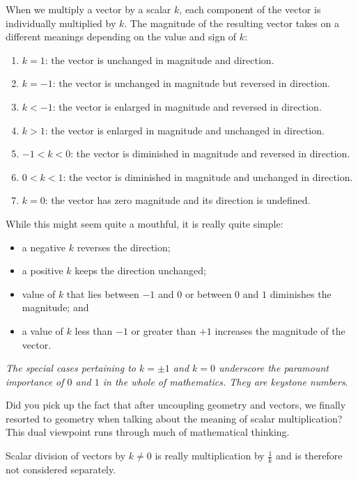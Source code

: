 \documentclass[
  a4paper,
]{article}
\providecommand{\tightlist}{%
  \setlength{\itemsep}{0pt}\setlength{\parskip}{0pt}}
\begin{document}
When we multiply a vector by a scalar \(k\), each component of the
vector is individually multiplied by \(k\). The magnitude of the
resulting vector takes on a different meanings depending on the value
and sign of \(k\):

\begin{enumerate}
\item
  \(k = 1\): the vector is unchanged in magnitude and direction.
\item
  \(k = -1\): the vector is unchanged in magnitude but reversed in
  direction.
\item
  \(k < -1\): the vector is enlarged in magnitude and reversed in
  direction.
\item
  \(k > 1\): the vector is enlarged in magnitude and unchanged in
  direction.
\item
  \(-1 < k < 0\): the vector is diminished in magnitude and reversed in
  direction.
\item
  \(0 < k < 1\): the vector is diminished in magnitude and unchanged in
  direction.
\item
  \(k = 0\): the vector has zero magnitude and its direction is
  undefined.
\end{enumerate}

While this might seem quite a mouthful, it is really quite simple:

\begin{itemize}
\tightlist
\item
  a negative \(k\) reverses the direction;
\item
  a positive \(k\) keeps the direction unchanged;
\item
  value of \(k\) that lies between \(-1\) and \(0\) or between \(0\) and
  \(1\) diminishes the magnitude; and
\item
  a value of \(k\) less than \(-1\) or greater than \(+1\) increases the
  magnitude of the vector.
\end{itemize}

\emph{The special cases pertaining to \(k = \pm 1\) and \(k = 0\)
underscore the paramount importance of \(0\) and \(1\) in the whole of
mathematics. They are keystone numbers}.

Did you pick up the fact that after uncoupling geometry and vectors, we
finally resorted to geometry when talking about the meaning of scalar
multiplication? This dual viewpoint runs through much of mathematical
thinking.

Scalar division of vectors by \(k \ne 0\) is really multiplication by
\(\frac{1}{k}\) and is therefore not considered separately.
\end{document}
